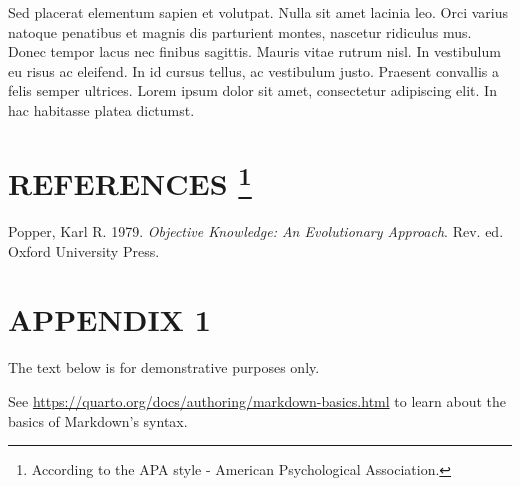 \documentclass[
  12pt,
  a4paper,
  oneside]{tesesusp}
\newlength{\cslhangindent}
\newlength{\cslentryspacingunit} %
\newenvironment{CSLReferences}[2] %
 {%
  \setlength{\parindent}{0pt}
  \ifodd #1
  \let\oldpar\par
  \def\par{\hangindent=\cslhangindent\oldpar}
  \fi
  \setlength{\parskip}{#2\cslentryspacingunit}
 }%
 {}
\begin{document}
Sed placerat elementum sapien et volutpat. Nulla sit amet lacinia leo.
Orci varius natoque penatibus et magnis dis parturient montes, nascetur
ridiculus mus. Donec tempor lacus nec finibus sagittis. Mauris vitae
rutrum nisl. In vestibulum eu risus ac eleifend. In id cursus tellus, ac
vestibulum justo. Praesent convallis a felis semper ultrices. Lorem
ipsum dolor sit amet, consectetur adipiscing elit. In hac habitasse
platea dictumst.


\hypertarget{references-1}{%
\chapter*{\texorpdfstring{REFERENCES
\footnote{According to the APA style - American Psychological
  Association.}}{REFERENCES }}\label{references-1}}


\postextual

\hypertarget{refs}{}
\begin{CSLReferences}{1}{0}
\leavevmode{}%
Popper, Karl R. 1979. \emph{Objective Knowledge: An Evolutionary
Approach}. Rev. ed. Oxford University Press.

\end{CSLReferences}

\cleardoublepage
{}
{}
\appendix

\hypertarget{appendix-1}{%
\chapter{APPENDIX 1}\label{appendix-1}}

\begin{tcolorbox}[enhanced jigsaw, titlerule=0mm, toprule=.15mm, left=2mm, rightrule=.15mm, breakable, title=\textcolor{quarto-callout-tip-color}{\faLightbulb}\hspace{0.5em}{Tip}, bottomrule=.15mm, coltitle=black, leftrule=.75mm, colframe=quarto-callout-tip-color-frame, opacitybacktitle=0.6, bottomtitle=1mm, toptitle=1mm, colbacktitle=quarto-callout-tip-color!10!white, arc=.35mm, opacityback=0, colback=white]

The text below is for demonstrative purposes only.

\vspace{5pt}

See \url{https://quarto.org/docs/authoring/markdown-basics.html} to
learn about the basics of Markdown's syntax.

\end{tcolorbox}
\end{document}
